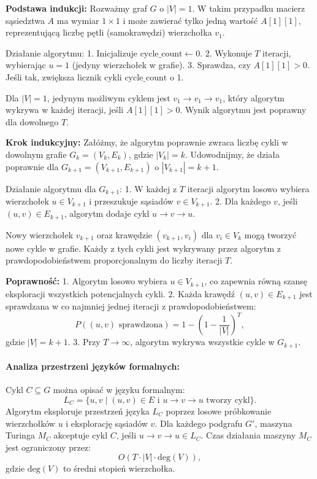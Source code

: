 \textbf{Podstawa indukcji:}  
Rozważmy graf \( G \) o \( |V| = 1 \). W takim przypadku macierz sąsiedztwa \( A \) ma wymiar \( 1 \times 1 \) i może zawierać tylko jedną wartość \( A[1][1] \), reprezentującą liczbę pętli (samokrawędzi) wierzchołka \( v_1 \).

Działanie algorytmu:
1. Inicjalizuje \( \text{cycle\_count} \gets 0 \).
2. Wykonuje \( T \) iteracji, wybierając \( u = 1 \) (jedyny wierzchołek w grafie).
3. Sprawdza, czy \( A[1][1] > 0 \). Jeśli tak, zwiększa licznik cykli \( \text{cycle\_count} \) o 1.

Dla \( |V| = 1 \), jedynym możliwym cyklem jest \( v_1 \to v_1 \to v_1 \), który algorytm wykrywa w każdej iteracji, jeśli \( A[1][1] > 0 \). Wynik algorytmu jest poprawny dla dowolnego \( T \).

\textbf{Krok indukcyjny:}  
Załóżmy, że algorytm poprawnie zwraca liczbę cykli w dowolnym grafie \( G_k = (V_k, E_k) \), gdzie \( |V_k| = k \). Udowodnijmy, że działa poprawnie dla \( G_{k+1} = (V_{k+1}, E_{k+1}) \) o \( |V_{k+1}| = k+1 \).

Działanie algorytmu dla \( G_{k+1} \):
1. W każdej z \( T \) iteracji algorytm losowo wybiera wierzchołek \( u \in V_{k+1} \) i przeszukuje sąsiadów \( v \in V_{k+1} \).
2. Dla każdego \( v \), jeśli \( (u, v) \in E_{k+1} \), algorytm dodaje cykl \( u \to v \to u \).

Nowy wierzchołek \( v_{k+1} \) oraz krawędzie \( (v_{k+1}, v_i) \) dla \( v_i \in V_k \) mogą tworzyć nowe cykle w grafie. Każdy z tych cykli jest wykrywany przez algorytm z prawdopodobieństwem proporcjonalnym do liczby iteracji \( T \).

\textbf{Poprawność:}  
1. Algorytm losowo wybiera \( u \in V_{k+1} \), co zapewnia równą szansę eksploracji wszystkich potencjalnych cykli.
2. Każda krawędź \( (u, v) \in E_{k+1} \) jest sprawdzana w co najmniej jednej iteracji z prawdopodobieństwem:
\[
P((u, v) \text{ sprawdzona}) = 1 - \left(1 - \frac{1}{|V|}\right)^T,
\]
gdzie \( |V| = k+1 \).
3. Przy \( T \to \infty \), algorytm wykrywa wszystkie cykle w \( G_{k+1} \).

\paragraph{Analiza przestrzeni języków formalnych:}
Cykl \( C \subseteq G \) można opisać w języku formalnym:
\[
L_C = \{ u, v \mid (u, v) \in E \text{ i } u \to v \to u \text{ tworzy cykl} \}.
\]
Algorytm eksploruje przestrzeń języka \( L_C \) poprzez losowe próbkowanie wierzchołków \( u \) i eksplorację sąsiadów \( v \). Dla każdego podgrafu \( G' \), maszyna Turinga \( M_C \) akceptuje cykl \( C \), jeśli \( u \to v \to u \in L_C \). Czas działania maszyny \( M_C \) jest ograniczony przez:
\[
O(T \cdot |V| \cdot \text{deg}(V)),
\]
gdzie \( \text{deg}(V) \) to średni stopień wierzchołka.


